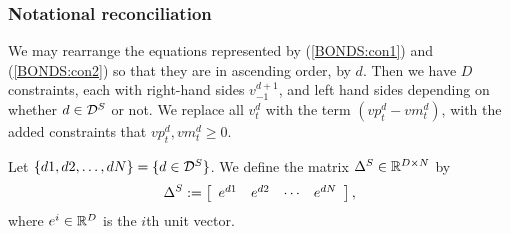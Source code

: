 \subsubsection{Notational reconciliation}

We may rearrange the equations represented by (\ref{BONDS:con1}) and (\ref{BONDS:con2}) so that they are in ascending order, by $d$.  Then we have $D$ constraints, each with right-hand sides $v_{-1}^{d+1}$, and left hand sides depending on whether $d\in {\cal D}^S$ or not.  We replace all $v_t^d$ with the term $(vp_t^d - vm_t^d)$, with the added constraints that $vp_t^d, vm_t^d \geq 0$.

Let $\{d1, d2, \ldots, dN\} = \{d \in {\cal D}^S\}$.  We define the matrix $\Delta^S \in {\mathbb R}^{D \times N}$ by
\begin{equation*}
\Delta^S := \left[
\begin{array}{cccc}
e^{d1}	& e^{d2}	& \cdots&	e^{dN}
\end{array}
\right],
\end{equation*}
where $e^i \in {\mathbb R}^D$ is the $i$th unit vector.

